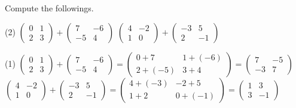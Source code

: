 \begin{frame}[t]
\begin{ex}
Compute the followings.
\begin{tasks}(2)
\task $\begin{pmatrix} 0 & 1 \\ 2 & 3 \end{pmatrix} +  \begin{pmatrix} 7 & -6 \\ -5 & 4 \end{pmatrix}$
\task $\begin{pmatrix} 4 & -2 \\ 1 & 0 \end{pmatrix} +  \begin{pmatrix} -3 & 5 \\ 2 & -1 \end{pmatrix}$
\end{tasks}
\end{ex}
\begin{sol}
\begin{tasks}(1)
\task $\begin{pmatrix} 0 & 1 \\ 2 & 3 \end{pmatrix} +  \begin{pmatrix} 7 & -6 \\ -5 & 4 \end{pmatrix} = \begin{pmatrix} 0+7 & 1+(-6) \\ 2+(-5) & 3+4 \end{pmatrix} = \begin{pmatrix} 7 & -5 \\-3 & 7 \end{pmatrix}$
\task $\begin{pmatrix} 4 & -2 \\ 1 & 0 \end{pmatrix} +  \begin{pmatrix} -3 & 5 \\ 2 & -1 \end{pmatrix} = \begin{pmatrix} 4+(-3) & -2+5 \\ 1+2 & 0+(-1) \end{pmatrix} = \begin{pmatrix} 1 & 3 \\ 3 & -1 \end{pmatrix}$
\end{tasks}
\end{sol}
\end{frame}


